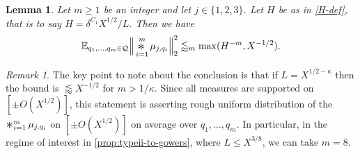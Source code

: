 \documentclass[11pt,reqno]{amsart}
\numberwithin{equation}{section}
\newtheorem{lemma}[theorem]{Lemma}
\theoremstyle{definition}
\theoremstyle{remark}
\newtheorem*{remark}{Remark}
\newcommand{\mb}{\mathbb}
\newcommand{\mc}{\mathcal}
\renewcommand{\le}{\leqslant}
\renewcommand{\ge}{\geqslant}
\newcommand\E{\mb{E}}
\newcommand{\conv}{\mathop{\scalebox{1.5}{\raisebox{-0.2ex}{$\ast$}}}}
\begin{document}
\begin{lemma}\label{lem:diophantine-upp}
Let $m \ge 1$ be an integer and let $j \in \{1,2,3\}$. Let $H$ be as in \cref{H-def}, that is to say $H = \delta^{C_1}X^{1/2}/L$. Then we have 
\[ \E_{q_1,\dots, q_{m} \in \mc{Q}} \Big\Vert \conv_{i=1}^{m} \mu_{j,q_i}\Big\Vert^2_{2} \lessapprox_{m} \max(H^{-m},  X^{-1/2}). \]
\end{lemma}
\begin{remark}
The key point to note about the conclusion is that if $L = X^{1/2 - \kappa}$ then the bound is $\lessapprox X^{-1/2}$ for $m > 1/\kappa$. Since all measures are supported on $[\pm O(X^{1/2})]$, this statement is asserting rough uniform distribution of the $\conv_{i=1}^{m} \mu_{j,q_i}$ on $[\pm O(X^{1/2})]$ on average over $q_1,\dots, q_{m}$. In particular, in the regime of interest in \cref{prop:typeii-to-gowers}, where $L \le X^{3/8}$, we can take $m = 8$.
\end{remark}
\end{document}
